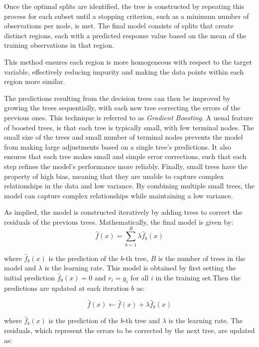 Once the optimal splits are identified, the tree is constructed by repeating this process for each subset until a stopping criterion, such as a minimum number of observations per node, is met. 
The final model consists of splits that create distinct regions, each with a predicted response value based on the mean of the training observations in that region.

This method ensures each region is more homogeneous with respect to the target variable, effectively reducing impurity and making the data points within each region more similar.

The predictions resulting from the decision trees can then be improved by growing the trees sequentially, with each new tree correcting the errors of the previous ones.
This technique is referred to as \textit{Gradient Boosting}.
A usual feature of boosted trees, is that each tree is typically small, with few terminal nodes.
The small size of the trees and small number of terminal nodes prevents the model from making large adjustments based on a single tree's predictions.
It also ensures that each tree makes small and simple error corrections, such that each step refines the model's performance more reliably.
Finally, small trees have the property of high bias, meaning that they are unable to capture complex relationships in the data and low variance.
By combining multiple small trees, the model can capture complex relationships while maintaining a low variance.

As implied, the model is constructed iteratively by adding trees to correct the residuals of the previous trees. Mathematically, the final model is given by:
\begin{equation}
    \hat{f}(x) = \sum_{b=1}^{B} \lambda \hat{f}_b(x) 
\label{eq:boosted_tree}
\end{equation}

where $\hat{f}_b(x)$ is the prediction of the $b$-th tree, $B$ is the number of trees in the model and $\lambda$ is the learning rate.
This model is obtained by first setting the initial prediction $\hat{f}_0(x) = 0$ and $r_i = y_i$ for all $i$ in the training set.Then the predictions are updated at each iteration $b$ as: 

$$
\hat{f}(x) \leftarrow \hat{f}(x) + \lambda \hat{f}_b(x)
$$

where $\hat{f}_b(x)$ is the prediction of the $b$-th tree and $\lambda$ is the learning rate. 
The residuals, which represent the errors to be corrected by the next tree, are updated as:

